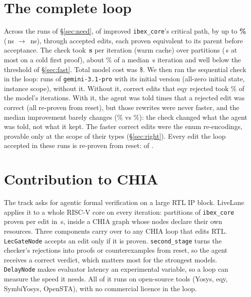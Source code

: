 \documentclass[sigconf,nonacm]{acmart}
\begin{document}
\section{The complete loop}
\label{sec:closed}

Across the runs of \S\ref{sec:need}, \AGimproved{} of \AGruns{} improved \texttt{ibex\_core}'s critical path, by up to \textbf{\AGbestPct\%}
(\AGbestFrom\,ns $\rightarrow$ \AGbestTo\,ns), through \AGaccepted{} accepted
edits, each proven equivalent to its parent before acceptance. The check
took \textbf{\AGgateWarm\,s} per iteration (warm cache) over \AGparts{}
partitions (\AGgateCold\,s at most on a cold first proof), about
\AGgateShare\% of a median \AGiterMedian\,s iteration and well below the
threshold of \S\ref{sec:fast}. Total model cost was \$\AGcost. We then ran the
sequential check in the loop: \ABtrtRuns{} runs of \texttt{gemini-3.1-pro} with
its initial version (all-zero initial state, instance scope), \ABctlRuns{}
without it. Without it, correct edits that eqy rejected took \ABctlLostPct\% of
the model's iterations. With it, the agent was told \ABtold{} times that a
rejected edit was correct (all \ABtoldReproven{} re-proven from reset), but
those rewrites were never faster, and the median improvement barely changes
(\ABtrtMed\% vs \ABctlMed\%): the check changed what the agent was told, not
what it kept. The faster correct edits were the enum re-encodings, provable
only at the scope of their types (\S\ref{sec:right}).\ABscSentence{}\ABgenSentence{}
Every edit the loop accepted in these runs is re-proven from reset: \ABaccReproven{} of \ABacc{}.

\section{Contribution to CHIA}

The track asks for agentic formal verification on a large RTL IP block.
LiveLane applies it to a whole RISC-V core on every iteration: \AGparts{}
partitions of \texttt{ibex\_core} proven per edit in \AGgateWarm\,s, inside a
CHIA graph whose nodes declare their own resources. Three components carry over
to any CHIA loop that edits RTL. \texttt{LecGateNode} accepts an edit only if
it is proven. \texttt{second\_stage} turns the checker's rejections into proofs
or counterexamples from reset, so the agent receives a correct verdict, which
matters most for the strongest models. \texttt{DelayNode} makes evaluator
latency an experimental variable, so a loop can measure the speed it needs. All of it runs on open-source tools
(Yosys, eqy, SymbiYosys, OpenSTA), with no commercial licence in the loop.
\end{document}
